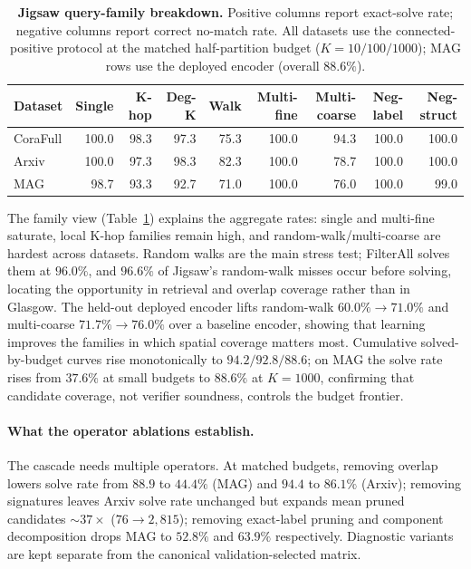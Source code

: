 \documentclass[sigconf, nonacm]{acmart}
\begin{document}
\begin{table}[t]
\centering
\caption{\textbf{Jigsaw query-family breakdown.} Positive columns report exact-solve rate; negative columns report correct no-match rate. All datasets use the connected-positive protocol at the matched half-partition budget ($K{=}10/100/1000$); MAG rows use the deployed encoder (overall $88.6\%$).}
\label{tab:jigsaw_family}
\setlength{\tabcolsep}{6pt}
\small
\begin{tabular}{lrrrrrrrr}
\toprule
\textbf{Dataset} & \textbf{Single} & \textbf{K-hop} & \textbf{Deg-K} & \textbf{Walk} & \textbf{Multi-fine} & \textbf{Multi-coarse} & \textbf{Neg-label} & \textbf{Neg-struct} \\
\midrule
CoraFull & 100.0 & 98.3 & 97.3 & 75.3 & 100.0 & 94.3 & 100.0 & 100.0 \\
Arxiv & 100.0 & 97.3 & 98.3 & 82.3 & 100.0 & 78.7 & 100.0 & 100.0 \\
MAG & 98.7 & 93.3 & 92.7 & 71.0 & 100.0 & 76.0 & 100.0 & 99.0 \\
\bottomrule
\end{tabular}
\end{table}

The family view (Table~\ref{tab:jigsaw_family}) explains the aggregate rates: single and multi-fine saturate, local K-hop families remain high, and random-walk/multi-coarse are hardest across datasets. Random walks are the main stress test; FilterAll solves them at $96.0\%$, and $96.6\%$ of Jigsaw's random-walk misses occur before solving, locating the opportunity in retrieval and overlap coverage rather than in Glasgow. The held-out deployed encoder lifts random-walk $60.0\%{\to}71.0\%$ and multi-coarse $71.7\%{\to}76.0\%$ over a baseline encoder, showing that learning improves the families in which spatial coverage matters most. Cumulative solved-by-budget curves rise monotonically to $94.2/92.8/88.6$; on MAG the solve rate rises from $37.6\%$ at small budgets to $88.6\%$ at $K{=}1000$, confirming that candidate coverage, not verifier soundness, controls the budget frontier.

\paragraph{What the operator ablations establish.}
The cascade needs multiple operators. At matched budgets, removing overlap lowers solve rate from $88.9$ to $44.4\%$ (MAG) and $94.4$ to $86.1\%$ (Arxiv); removing signatures leaves Arxiv solve rate unchanged but expands mean pruned candidates ${\sim}37\times$ ($76{\to}2{,}815$); removing exact-label pruning and component decomposition drops MAG to $52.8\%$ and $63.9\%$ respectively. Diagnostic variants are kept separate from the canonical validation-selected matrix.
\end{document}
